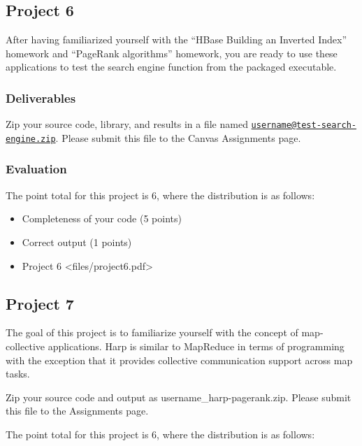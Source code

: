 \subsection{Project 6}\label{project-6}

After having familiarized yourself with the ``HBase Building an Inverted
Index'' homework and ``PageRank algorithms'' homework, you are ready to
use these applications to test the search engine function from the
packaged executable.

\subsubsection{Deliverables}\label{deliverables}

Zip your source code, library, and results in a file named
\href{mailto:username@test-search-engine.zip}{\nolinkurl{username@test-search-engine.zip}}.
Please submit this file to the Canvas Assignments page.

\subsubsection{Evaluation}\label{evaluation}

The point total for this project is 6, where the distribution is as
follows:

\begin{itemize}

\item
  Completeness of your code (5 points)
\item
  Correct output (1 points)
\item
  Project 6 \textless{}files/project6.pdf\textgreater{}
\end{itemize}

\subsection{Project 7}\label{project-7}

The goal of this project is to familiarize yourself with the concept of
map-collective applications. Harp is similar to MapReduce in terms of
programming with the exception that it provides collective communication
support across map tasks.

Zip your source code and output as username\_harp-pagerank.zip. Please
submit this file to the Assignments page.

The point total for this project is 6, where the distribution is as
follows:

